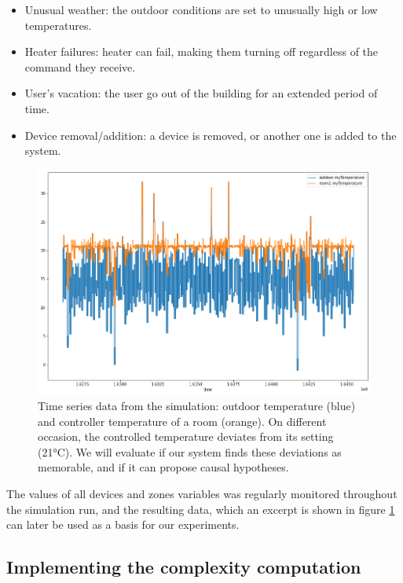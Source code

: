 \documentclass[conference]{IEEEtran}
\begin{document}
\begin{itemize}
  \item Unusual weather: the outdoor conditions are set to unusually high or
        low temperatures.
  \item Heater failures: heater can fail, making them turning off regardless
        of the command they receive.
  \item User's vacation: the user go out of the building for an extended
        period of time.
  \item Device removal/addition: a device is removed, or another one is added
        to the system.
\end{itemize}


\begin{figure}[ht]
  \includegraphics[width=\linewidth]{figures/ts_example}
  \caption{Time series data from the simulation: outdoor temperature (blue) and
    controller temperature of a room (orange). On different occasion, the
    controlled temperature deviates from its setting (21°C). We will evaluate if
    our system finds these deviations as memorable, and if it can propose causal
    hypotheses.}
  \label{fig:ts_example}
\end{figure}

The values of all devices and zones variables was regularly monitored throughout
the simulation run, and the resulting data, which an excerpt is shown in figure
\ref{fig:ts_example} can later be used as a basis for our experiments.


\subsection{Implementing the complexity computation}
\end{document}
